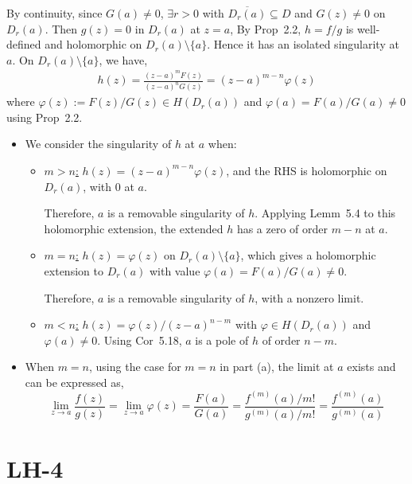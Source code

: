 \documentclass[a4paper]{article}
\begin{document}
By continuity, since $G(a) \neq 0$, $\exists r > 0$ with $\overline{D_r(a)} \subseteq D$ and $G(z) \neq 0$ on $D_r(a)$. Then $g(z) = 0$ in $D_r(a)$ at $z = a$, By Prop~2.2, $h = f/g$ is well-defined and holomorphic on $D_r(a) \setminus \{a\}$. Hence it has an isolated singularity at $a$. On $D_r(a) \setminus \{a\}$, we have,
\begin{align*}
h(z) = \frac{(z-a)^m F(z)}{(z-a)^n G(z)} = (z-a)^{m-n} \varphi(z)
\end{align*}
where $\varphi(z) := F(z)/G(z) \in H(D_r(a))$ and $\varphi(a) = F(a)/G(a) \neq 0$ using Prop~2.2.

\begin{itemize}
    \item[\textbf{(a)}] We consider the singularity of $h$ at $a$ when:
    \begin{itemize}
        \item[\textbullet] \underline{$m > n$:} $h(z) = (z-a)^{m-n} \varphi(z)$, and the RHS is holomorphic on $D_r(a)$, with $0$ at $a$. 
        
        Therefore, $a$ is a removable singularity of $h$. Applying Lemm~5.4 to this holomorphic extension, the extended $h$ has a zero of order $m - n$ at $a$.
        
        \item[\textbullet] \underline{$m = n$:} $h(z) = \varphi(z)$ on $D_r(a) \setminus \{a\}$, which gives a holomorphic extension to $D_r(a)$ with value $\varphi(a) = F(a)/G(a) \neq 0$. 
        
        Therefore, $a$ is a removable singularity of $h$, with a nonzero limit.
        
        \item[\textbullet] \underline{$m < n$:} $h(z) = \varphi(z)/(z-a)^{n-m}$ with $\varphi \in H(D_r(a))$ and $\varphi(a) \neq 0$. Using Cor~5.18, $a$ is a pole of $h$ of order $n - m$.
    \end{itemize}
    
    \item[\textbf{(b)}] When $m = n$, using the case for $m = n$ in part (a), the limit at $a$ exists and can be expressed as,
    \[
    \lim_{z \to a} \frac{f(z)}{g(z)} = \lim_{z \to a} \varphi(z) = \frac{F(a)}{G(a)} = \frac{f^{(m)}(a)/m!}{g^{(m)}(a)/m!} = \frac{f^{(m)}(a)}{g^{(m)}(a)}
    \]
\end{itemize}
\newpage
\section*{LH-4}
\end{document}
